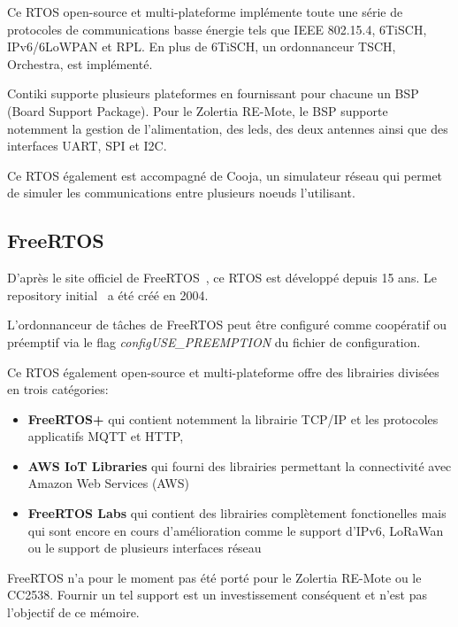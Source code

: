     Ce RTOS open-source et multi-plateforme implémente toute une série de protocoles de communications basse énergie tels que IEEE 802.15.4, 6TiSCH, IPv6/6LoWPAN et RPL. En plus de 6TiSCH, un ordonnanceur TSCH, Orchestra, est implémenté.
    

    Contiki supporte plusieurs plateformes en fournissant pour chacune un BSP (Board Support Package). Pour le Zolertia RE-Mote, le BSP supporte notemment la gestion de l'alimentation, des leds, des deux antennes ainsi que des interfaces UART, SPI et I2C.

    Ce RTOS également est accompagné de Cooja, un simulateur réseau qui permet de simuler les communications entre plusieurs noeuds l'utilisant.

\subsection*{FreeRTOS}
    D'après le site officiel de FreeRTOS~\cite{freertos}, ce RTOS est développé depuis 15 ans.
    Le repository initial~\cite{freertos:repo} a été créé en 2004.

    L'ordonnanceur de tâches de FreeRTOS peut être configuré comme coopératif ou préemptif via le flag \textit{configUSE\_PREEMPTION} du fichier de configuration.

    Ce RTOS également open-source et multi-plateforme offre des librairies divisées en trois catégories:
    \begin{itemize}

        \item \textbf{FreeRTOS+} qui contient notemment la librairie TCP/IP et les protocoles applicatifs MQTT et HTTP,
        \item \textbf{AWS IoT Libraries} qui fourni des librairies permettant la connectivité avec Amazon Web Services (AWS)
        \item \textbf{FreeRTOS Labs} qui contient des librairies complètement fonctionelles mais qui sont encore en cours d'amélioration comme le support d'IPv6, LoRaWan ou le support de plusieurs interfaces réseau
    \end{itemize}

    FreeRTOS n'a pour le moment pas été porté pour le Zolertia RE-Mote ou le CC2538. Fournir un tel support est un investissement conséquent et n'est pas l'objectif de ce mémoire.

